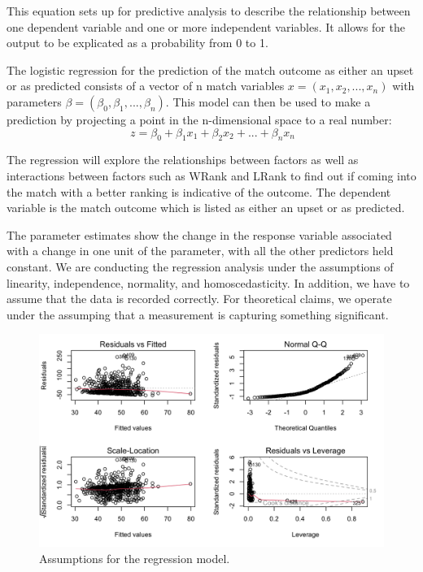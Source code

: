 \documentclass[12pt]{article}
\begin{document}
This equation sets up for predictive analysis to describe the relationship between 
one dependent variable and one or more independent variables. It allows for the output 
to be explicated as a probability from 0 to 1.
  
The logistic regression for the prediction of the match outcome as either an upset or as predicted 
consists of a vector of n match variables $x = (x_1, x_2,..., x_n)$ with parameters $\beta = (\beta_0,
\beta_1,...,\beta_n)$. This model can then be used to make a prediction by projecting a point in 
the n-dimensional space to a real number:
\begin{equation}
  \label{eq:logreg}
    \ z = \beta_0 + \beta_1 x_1 + \beta_2 x_2 + ... + \beta_nx_n
\end{equation}

The regression will explore the relationships between factors as well as interactions 
between factors such as WRank and LRank to find out if coming into the match with a 
better ranking is indicative of the outcome. The dependent variable is the match outcome 
which is listed as either an upset or as predicted.

The parameter estimates show the change in the response variable associated with a change in one 
unit of the parameter, with all the other predictors held constant. We are conducting the regression 
analysis under the assumptions of linearity, independence, normality, and homoscedasticity. In 
addition, we have to assume that the data is recorded correctly. For theoretical claims, we operate 
under the assumping that a measurement is capturing something significant.

\begin{figure} [! h]
  \centering
  \includegraphics[width=\textwidth, scale=0.5]{assumptions.pdf}
  \caption{Assumptions for the regression model.}
 \label{fig:assumptions}
\end{figure}
\end{document}
